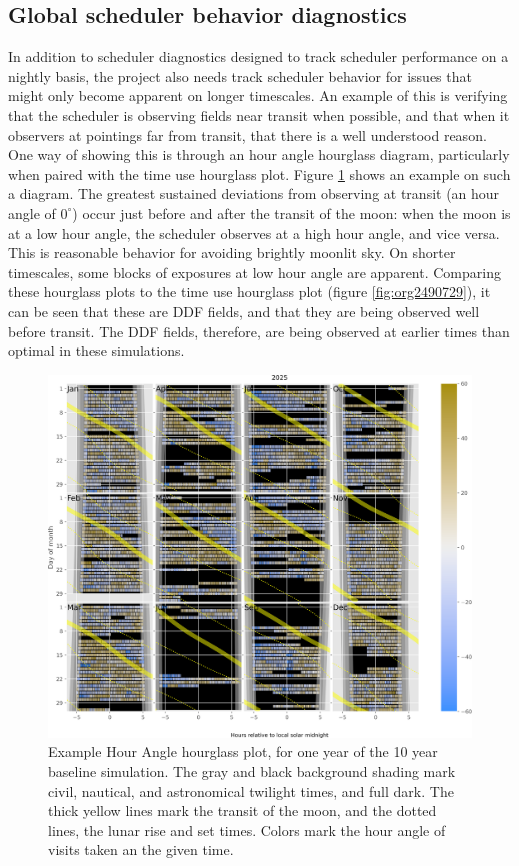 \subsection{Global scheduler behavior diagnostics}
\label{sec:orgbef5d79}
In addition to scheduler diagnostics designed to track scheduler performance on a nightly basis, the project also needs track scheduler behavior for issues that might only become apparent on longer timescales.
An example of this is verifying that the scheduler is observing fields near transit when possible, and that when it observers at pointings far from transit, that there is a well understood reason.
One way of showing this is through an hour angle hourglass diagram, particularly when paired with the time use hourglass plot.
Figure \ref{fig:org7a556ae} shows an example on such a diagram.
The greatest sustained deviations from observing at transit (an hour angle of \(0^{\circ}\)) occur just before and after the transit of the moon: when the moon is at a low hour angle, the scheduler observes at a high hour angle, and vice versa.
This is reasonable behavior for avoiding brightly moonlit sky.
On shorter timescales, some blocks of exposures at low hour angle are apparent.
Comparing these hourglass plots to the time use hourglass plot (figure \ref{fig:org2490729}), it can be seen that these are DDF fields, and that they are being observed well before transit.
The DDF fields, therefore, are being observed at earlier times than optimal in these simulations.

\begin{figure}[htbp]
\centering
\includegraphics[width=1.0\textwidth]{./figures/hour_angle_hourglass.png}
\caption{\label{fig:org7a556ae}Example Hour Angle hourglass plot, for one year of the 10 year baseline simulation. The gray and black background shading mark civil, nautical, and astronomical twilight times, and full dark. The thick yellow lines mark the transit of the moon, and the dotted lines, the lunar rise and set times. Colors mark the hour angle of visits taken an the given time.}
\end{figure}


